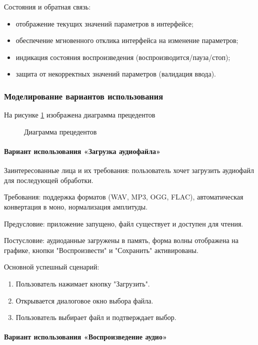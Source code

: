 Состояния и обратная связь:
\begin{itemize}
	\item отображение текущих значений параметров в интерфейсе;
	\item обеспечение мгновенного отклика интерфейса на изменение параметров;
	\item индикация состояния воспроизведения (воспроизводится/пауза/стоп);
	\item защита от некорректных значений параметров (валидация ввода).
\end{itemize}

\subsubsection{Моделирование вариантов использования}

На рисунке \ref{fig:use_case_diagram} изображена диаграмма прецедентов

\begin{figure}[ht]
	\caption{Диаграмма прецедентов}
	\label{fig:use_case_diagram}
\end{figure}

\paragraph{Вариант использования «Загрузка аудиофайла»}
Заинтересованные лица и их требования: пользователь хочет загрузить аудиофайл для последующей обработки.

Требования: поддержка форматов (WAV, MP3, OGG, FLAC), автоматическая конвертация в моно, нормализация амплитуды.

Предусловие: приложение запущено, файл существует и доступен для чтения.

Постусловие: аудиоданные загружены в память, форма волны отображена на графике, кнопки "Воспроизвести" и "Сохранить" активированы.

Основной успешный сценарий:
\begin{enumerate}
	\item Пользователь нажимает кнопку "Загрузить".
	\item Открывается диалоговое окно выбора файла.
	\item Пользователь выбирает файл и подтверждает выбор.
\end{enumerate}

\paragraph{Вариант использования «Воспроизведение аудио»}

